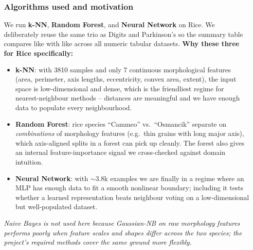 \documentclass[11pt]{article}
\begin{document}
\subsubsection{Algorithms used and motivation}
We run \textbf{k-NN}, \textbf{Random Forest}, and \textbf{Neural Network} on Rice. We deliberately reuse the same trio as Digits and Parkinson's so the summary table compares like with like across all numeric tabular datasets.
\newline
\textbf{Why these three for Rice specifically:}
\begin{itemize}
  \item \textbf{k-NN}: with 3810 samples and only 7 continuous morphological features (area, perimeter, axis lengths, eccentricity, convex area, extent), the input space is low-dimensional and dense, which is the friendliest regime for nearest-neighbour methods -- distances are meaningful and we have enough data to populate every neighbourhood.
  \item \textbf{Random Forest}: rice species ``Cammeo'' vs.\ ``Osmancik'' separate on \emph{combinations} of morphology features (e.g.\ thin grains with long major axis), which axis-aligned splits in a forest can pick up cleanly. The forest also gives an internal feature-importance signal we cross-checked against domain intuition.
  \item \textbf{Neural Network}: with $\sim$3.8k examples we are finally in a regime where an MLP has enough data to fit a smooth nonlinear boundary; including it tests whether a learned representation beats neighbour voting on a low-dimensional but well-populated dataset.
\end{itemize}
\emph{Naive Bayes is not used here because Gaussian-NB on raw morphology features performs poorly when feature scales and shapes differ across the two species; the project's required methods cover the same ground more flexibly.}
\end{document}
